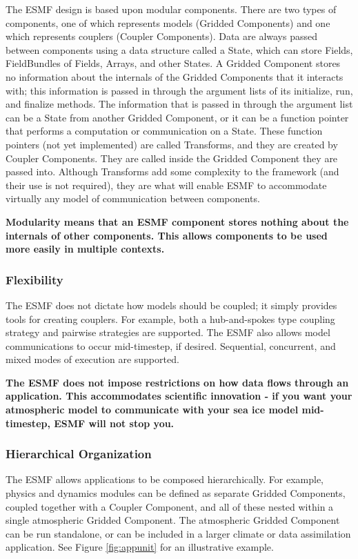 The ESMF design is based upon modular components.  There
are two types of components, one of which represents models 
(Gridded Components) and one which represents couplers (Coupler Components).  
Data are always passed between components using a data structure 
called a State, which can store Fields, FieldBundles of Fields,
Arrays, and other States.  A Gridded Component stores no information about 
the internals of the Gridded Components that it interacts with; this information 
is passed in through the argument lists of its initialize, run, 
and finalize methods.  The information that is 
passed in through the argument list can be a State from 
another Gridded Component, or it can be a function pointer that performs
a computation or communication on a State.  These function 
pointers (not yet implemented) are called Transforms, and they 
are created by Coupler Components.  They are called inside the 
Gridded Component they are passed into.  Although Transforms add 
some complexity to the framework (and their use is not required), they are what will
enable ESMF to accommodate virtually any model of communication 
between components. 

{\bf Modularity means that an ESMF component stores nothing about 
the internals of other components.  This allows components to be 
used more easily in multiple contexts.}

\subsubsection{Flexibility}
The ESMF does not dictate how models should be coupled; it
simply provides tools for creating couplers.  For example, 
both a hub-and-spokes type coupling strategy and  
pairwise strategies are supported.  The ESMF also allows model
communications to occur mid-timestep, if desired.  Sequential, 
concurrent, and mixed modes of execution are supported.  

{\bf The ESMF does not impose restrictions on how data flows through 
an application.  This accommodates scientific innovation - if you 
want your atmospheric model to communicate with your sea ice model
mid-timestep, ESMF will not stop you.}

\subsubsection{Hierarchical Organization}
\label{sec:principles-hierarchy}
The ESMF allows applications to be composed hierarchically.
For example, physics and dynamics modules can be defined as 
separate Gridded Components, coupled together with a Coupler Component, and all
of these nested within a single atmospheric Gridded Component.
The atmospheric Gridded Component can be run standalone, or can be included
in a larger climate or data assimilation application.  See Figure
\ref{fig:appunit} for an illustrative example.


